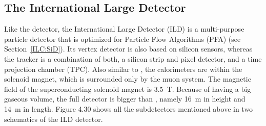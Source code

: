 \subsection{The International Large Detector} 

Like the \sid detector, the International Large Detector (ILD) is a multi-purpose particle detector that is optimized for Particle Flow Algorithms (PFA) (see Section~\ref{ILC:SiD}).
Its vertex detector is also based on silicon sensors, whereas the tracker is a combination of both, a silicon strip and pixel detector, and a time projection chamber (TPC).
Also similar to \sid, the calorimeters are within the solenoid magnet, which is surrounded only by the muon system.
The magnetic field of the superconducting solenoid magnet is \SI{3.5}{T}.
Because of having a big gaseous volume, the full detector is bigger than \sid, namely \SI{16}{m} in height and \SI{14}{m} in length.
Figure 4.30 shows all the subdetectors mentioned above in two schematics of the ILD detector.
